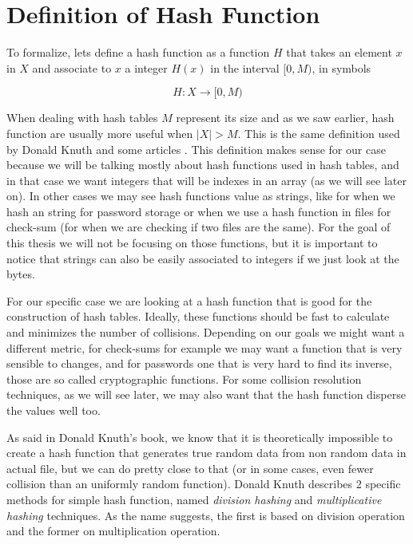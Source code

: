\bigskip

\section{Definition of Hash Function}

To formalize, lets define a hash function as a function \( H \) that takes an element \( x \) in \( X \) and associate to \( x \) a integer \( H(x) \) in the interval \( [0,M) \), in symbols

\[ H: X \rightarrow [0, M) \]

When dealing with hash tables \( M \) represent its size and as we saw earlier, hash function are usually more useful when \( |X| > M \). This is the same definition used by Donald Knuth \citep{TAOCP3} and some articles \citep{RobinHoodHashing}. This definition makes sense for our case because we will be talking mostly about hash functions used in hash tables, and in that case we want integers that will be indexes in an array (as we will see later on). In other cases we may see hash functions value as strings, like for when we hash an string for password storage or when we use a hash function in files for check-sum (for when we are checking if two files are the same). For the goal of this thesis we will not be focusing on those functions, but it is important to notice that strings can also be easily associated to integers if we just look at the bytes.

For our specific case we are looking at a hash function that is good for the construction of hash tables. Ideally, these functions should be fast to calculate and minimizes the number of collisions. Depending on our goals we might want a different metric, for check-sums for example we may want a function that is very sensible to changes, and for passwords one that is very hard to find its inverse, those are so called cryptographic functions. For some collision resolution techniques, as we will see later, we may also want that the hash function disperse the values well too.

As said in Donald Knuth's book, we know that it is theoretically impossible to create a hash function that generates true random data from non random data in actual file, but we can do pretty close to that (or in some cases, even fewer collision than an uniformly random function).  Donald Knuth describes 2 specific methods for simple hash function, named \textit{division hashing} and \textit{multiplicative hashing} techniques. As the name suggests, the first is based on division operation and the former on multiplication operation.

